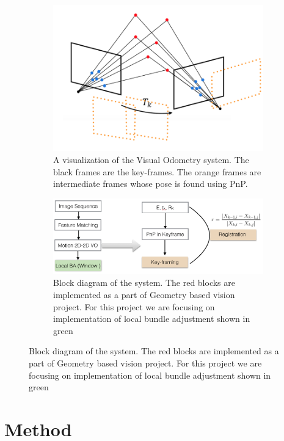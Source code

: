\documentclass[12pt,twocolumn,letterpaper]{article}
\begin{document}
\begin{figure}
    \centering
    \begin{subfigure}{.45\textwidth}
    \centering
        \includegraphics[width=\textwidth]{images/system}
        \caption{A visualization of the Visual Odometry system. The black frames are the key-frames. The orange frames are intermediate frames whose pose is found using PnP.}
        \label{fig:system}
    \end{subfigure}
    \begin{subfigure}{.45\textwidth}
    \centering
        \includegraphics[width=\textwidth]{images/block}
        \caption{Block diagram of the system. The red blocks are implemented as a part of Geometry based vision project. For this project we are focusing on implementation of local bundle adjustment shown in green}
        \label{fig:block}
    \end{subfigure}
\end{figure}

\section{Method}
\end{document}
